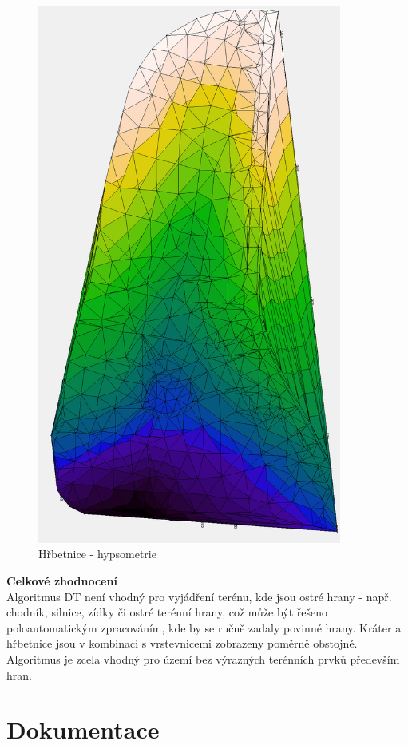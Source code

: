 \documentclass[a4paper, 12pt]{article}
\begin{document}
\begin{figure}[h]
	\centering
	\includegraphics[width=10cm]{DMT_hypsometrie.jpg}
	\caption{Hřbetnice - hypsometrie}
\end{figure}
\clearpage

\textbf{Celkové zhodnocení}\\

Algoritmus DT není vhodný pro vyjádření terénu, kde jsou ostré hrany - např. chodník, silnice, zídky či ostré terénní hrany, což může být řešeno poloautomatickým zpracováním, kde by se ručně zadaly povinné hrany. Kráter a hřbetnice jsou v kombinaci s vrstevnicemi zobrazeny poměrně obstojně. Algoritmus je zcela vhodný pro území bez výrazných terénních prvků především hran.
\clearpage

\section {Dokumentace}
\end{document}
